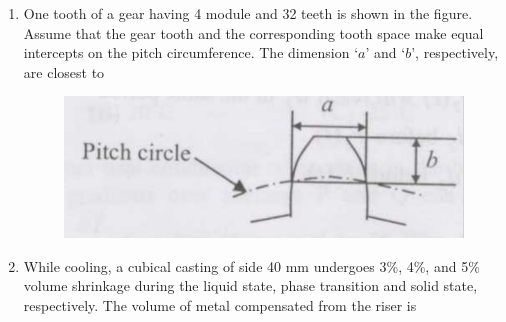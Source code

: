 \documentclass[journal,12pt,onecolumn]{IEEEtran}
\begin{document}
\begin{enumerate}
    \item One tooth of a gear having 4 module and 32 teeth is shown in the figure. Assume that the gear tooth and the corresponding tooth space make equal intercepts on the pitch circumference. The dimension `$a$' and `$b$', respectively, are closest to

          \begin{figure}[H]
              \centering
              \includegraphics[scale=0.3]{q62}
              \caption{}
              \label{q62}
          \end{figure}

          \begin{enumerate}
          \end{enumerate}

    \item While cooling, a cubical casting of side 40 mm undergoes 3\%, 4\%, and 5\% volume shrinkage during the liquid state, phase transition and solid state, respectively. The volume of metal compensated from the riser is\\

          \begin{enumerate}
          \end{enumerate}


\end{enumerate}
\end{document}
